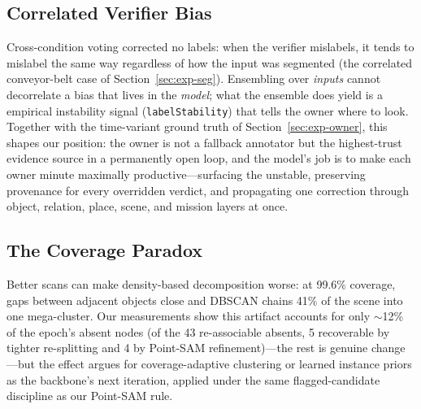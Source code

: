 \documentclass[electronics,article,accept,pdftex,moreauthors]{Definitions/mdpi}
\begin{document}
\subsection{Correlated Verifier Bias}
Cross-condition voting corrected no labels: when the verifier
mislabels, it tends to mislabel the same way regardless of how the
input was segmented (the correlated conveyor-belt case of
Section~\ref{sec:exp-seg}). Ensembling over \emph{inputs} cannot decorrelate a
bias that lives in the \emph{model}; what the ensemble does yield is a
empirical instability signal (\texttt{labelStability}) that tells the
owner where to look. Together with the time-variant ground truth of
Section~\ref{sec:exp-owner}, this shapes our position: the owner is not a
fallback annotator but the highest-trust evidence source in a
permanently open loop, and the model's job is to make each owner
minute maximally productive---surfacing the unstable, preserving
provenance for every overridden verdict, and propagating one correction
through object, relation, place, scene, and mission layers at once.

\subsection{The Coverage Paradox}
Better scans can make density-based decomposition worse: at 99.6\% coverage,
gaps between adjacent objects close and DBSCAN chains 41\% of the scene into
one mega-cluster. Our measurements show this artifact accounts for only
$\sim$12\% of the epoch's absent nodes (of the 43 re-associable absents,
5 recoverable by tighter re-splitting and 4 by Point-SAM
refinement)---the rest is genuine change---but
the effect argues for coverage-adaptive clustering or learned instance
priors as the backbone's next iteration, applied under the same
flagged-candidate discipline as our Point-SAM rule.
\end{document}
